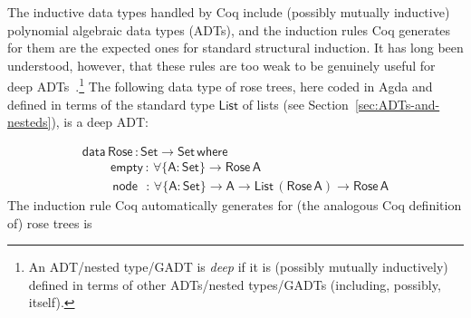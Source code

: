 \documentclass[9pt]{entcs}
\begin{document}
The inductive data types handled by Coq include (possibly mutually
inductive) polynomial algebraic data types (ADTs), and the induction
rules Coq generates for them are the expected ones for standard
structural induction. It has long been understood, however, that these
rules are too weak to be genuinely useful for deep
ADTs~\cite{jp20}.\footnote{An ADT/nested type/GADT is {\em deep} if it
  is (possibly mutually inductively) defined in terms of other
  ADTs/nested types/GADTs (including, possibly, itself).}  The
following data type of rose trees, here coded in Agda and defined in
terms of the standard type $\mathsf{List}$ of lists (see
Section~\ref{sec:ADTs-and-nesteds}), is a deep ADT:

\vspace*{-0.1in}

\[\begin{array}{l}
\mathsf{data\, Rose\, : Set \to Set\,where}\\
\mathsf{\;\;\;\;\;\;\;\;empty\, :\,\forall \{A : Set\} \to Rose\,A}\\
\mathsf{\;\;\;\;\;\;\;\;\,node\,\,\,\, :\, \forall \{A : Set\} \to A \to List\,(Rose\,A) \to Rose\,A} 
\end{array}\]
\noindent
The induction rule Coq automatically generates for (the analogous Coq
definition of) rose trees is

\vspace*{-0.075in}
\end{document}
